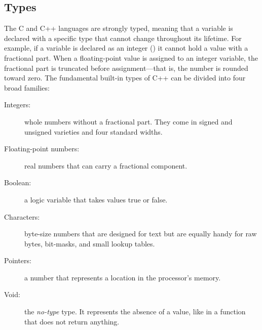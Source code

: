 \subsection{Types}
The C and C++ languages are strongly typed, meaning that a variable is declared with a specific type that cannot change throughout its lifetime.
For example, if a variable is declared as an integer () it cannot hold a value with a fractional part.
When a floating-point value is assigned to an integer variable, the fractional part is truncated before assignment---that is, the number is rounded toward zero.
The fundamental built-in types of C++ can be divided into four broad families:
\begin{description}
\item[Integers:] whole numbers without a fractional part. They come in signed and unsigned varieties and four standard widths.
\item[Floating-point numbers:] real numbers that can carry a fractional component.
\item[Boolean:] a logic variable that takes values true or false.
\item[Characters:] byte-size numbers that are designed for text but are equally handy for raw bytes, bit-masks, and small lookup tables.
\item[Pointers:] a number that represents a location in the processor's memory.
\item[Void:] the \emph{no-type} type. It represents the absence of a value, like in a function that does not return anything.
\end{description}

